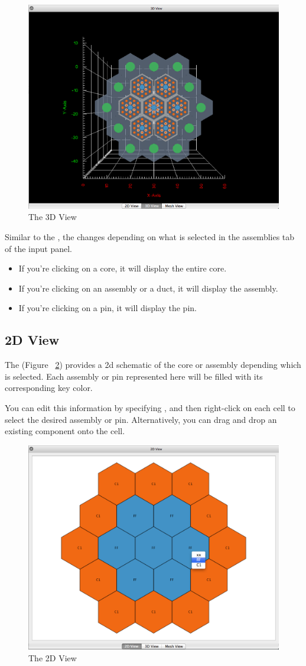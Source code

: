 \begin{figure}[h]
	\begin{center}
		\includegraphics[width=0.5\linewidth]{Images/3DView.png}
		\caption{The 3D View}
		\label{fig:3DView}
	\end{center}
\end{figure}

Similar to the , the  changes depending on what is selected in the assemblies tab of the input panel.

\begin{itemize}
	\item{If you're clicking on a core, it will display the entire core.}
	\item{If you're clicking on an assembly or a duct, it will display the assembly.}
	\item{If you're clicking on a pin, it will display the pin.}
\end{itemize}

\subsection{2D View}
The  (Figure ~\ref{fig:2DView}) provides a 2d schematic of the core or assembly depending which is selected. Each assembly or pin represented here will be filled with its corresponding key color.

You can edit this information by specifying , and then right-click on each cell to select the desired assembly or pin.  Alternatively, you can drag and drop an existing component onto the cell.

\begin{figure}[h]
	\begin{center}
		\includegraphics[width=0.5\linewidth]{Images/2DView.png}
		\caption{The 2D View}
		\label{fig:2DView}
	\end{center}
\end{figure}


